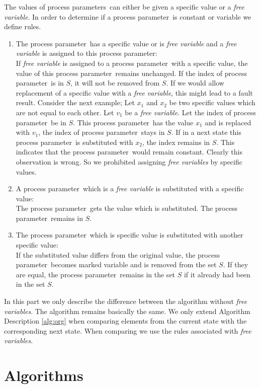 \index{}\documentclass[a4paper,10pt]{article}
\theoremstyle{plain}
\theoremstyle{definition}
\newcommand{\pp}{process parameter}
\newcommand{\pps}{process parameters}
\newcommand{\ti}{\textit}
\begin{document}
The values of \pps\ can either be given a specific value or a \ti{free variable}. In order to determine if a \pp\ is constant or variable we define rules.

\begin{enumerate}
\item The \pp\ has a specific value or is \ti{free variable} and a \ti{free variable} is assigned to this \pp :\\
If \ti{free variable} is assigned to a \pp\ with a specific value, the value of this \pp\ remains unchanged. If the index of \pp\ is in $S$, it will not be removed from $S$. If we would allow replacement of a specific value with a \ti{free variable}, this might lead to a fault result. Consider the next example; Let $x_1$ and $x_2$ be two specific values which are not equal to each other. Let $v_1$ be a \ti{free variable}. Let the index of \pp\ be in $S$. This \pp\ has the value $x_1$ and is replaced with $v_1$, the index of \pp\ stays in $S$. If in a next state this \pp\ is substituted with $x_2$, the index remains in $S$. This indicates that the \pp\ would remain constant. Clearly this observation is wrong. So we prohibited assigning \ti{free variables} by specific values.

\item A \pp\ which is a \ti{free variable} is substituted with a specific value:\\
The \pp\ gets the value which is substituted. 
The \pp\ remains in $S$.


\item The \pp\ which is specific value is substituted with another specific value:\\
If the substituted value differs from the original value, the \pp\ becomes marked variable and is removed from the set $S$.
If they are equal, the \pp\ remains in the set $S$ if it already had been in the set $S$.
\end{enumerate}

In this part we only describe the difference between the algorithm without \ti{free variables}. The algorithm remains basically the same. We only extend Algorithm Description \ref{alg:org} when comparing elements from the current state with the corresponding next state. When comparing we use the rules associated with \ti{free variables}.

\newpage
\section{Algorithms}
\end{document}
